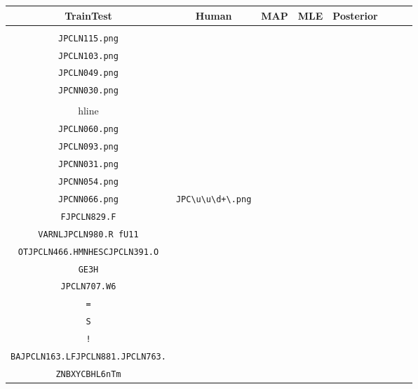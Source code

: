 \begin{longtable}{cccccccc}
  \toprule
  TrainTest&Human&MAP&MLE&Posterior\\\midrule

  
\begin{tabular}{l}
    \verb|JPCLN034.png|\\
\verb|JPCLN115.png|\\
\verb|JPCLN103.png|\\
\verb|JPCLN049.png|\\
\verb|JPCNN030.png|\\
\\hline\\
\verb|JPCLN060.png|\\
\verb|JPCLN093.png|\\
\verb|JPCNN031.png|\\
\verb|JPCNN054.png|\\
\verb|JPCNN066.png|
\end{tabular}

&
\verb|JPC\u\u\d+\.png|
&

\begin{tabular}{l}
    \verb|((\u)*JPCLN\d\d\d\.)*(\u)*(.)*|\\
\verb|FJPCLN829.F|\\
\verb|VARNLJPCLN980.R fU11|\\
\verb|OTJPCLN466.HMNHESCJPCLN391.O|\\
\verb|GE3H|\\
\verb|JPCLN707.W6|
\end{tabular}

&

\begin{tabular}{l}
    \verb|((\u)*JPCLN\d\d\d\.)*(\u)*(.)*|\\
\verb|=|\\
\verb|S|\\
\verb|!|\\
\verb|BAJPCLN163.LFJPCLN881.JPCLN763.|\\
\verb|ZNBXYCBHL6nTm|
\end{tabular}

&


\end{longtable}
